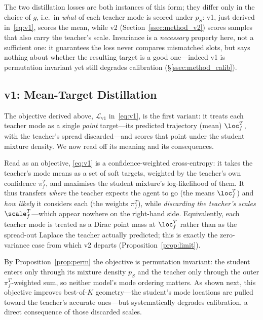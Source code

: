 The two distillation losses are both instances of this form; they differ only in the
choice of $g$, i.e.\ in \emph{what} of each teacher mode is scored under $p_S$: v1,
just derived in~\eqref{eq:v1}, scores the mean, while v2
(Section~\ref{ssec:method_v2}) scores samples that also carry the teacher's scale.
Invariance is a \emph{necessary} property here, not a sufficient one: it guarantees
the loss never compares mismatched slots, but says nothing about whether the
resulting target is a good one---indeed v1 is permutation invariant yet still
degrades calibration (\S\ref{ssec:method_calib}).

\subsection{v1: Mean-Target Distillation}
\label{ssec:method_v1}
The objective derived above, $\mathcal{L}_{\mathrm{v1}}$ in~\eqref{eq:v1}, is the
first variant: it treats each teacher mode as a single \emph{point} target---its
predicted trajectory (mean) $\loc^T_f$, with the teacher's spread discarded---and
scores that point under the student mixture density. We now read off its meaning and
its consequences.

Read as an objective, \eqref{eq:v1} is a confidence-weighted cross-entropy: it takes
the teacher's mode means as a set of soft targets, weighted by the teacher's own
confidence $\pi^T_f$, and maximises the student mixture's log-likelihood of them. It
thus transfers \emph{where} the teacher expects the agent to go (the means
$\loc^T_f$) and \emph{how likely} it considers each (the weights $\pi^T_f$), while
\emph{discarding the teacher's scales} $\scale^T_f$---which appear nowhere on the
right-hand side. Equivalently, each teacher mode is treated as a Dirac point mass at
$\loc^T_f$ rather than as the spread-out Laplace the teacher actually predicted; this
is exactly the zero-variance case from which v2 departs
(Proposition~\ref{prop:limit}).

By Proposition~\ref{prop:perm} the objective is permutation invariant: the student
enters only through its mixture density $p_S$ and the teacher only through the outer
$\pi^T_f$-weighted sum, so neither model's mode ordering matters. As shown next, this
objective improves best-of-$K$ geometry---the student's mode locations are pulled
toward the teacher's accurate ones---but systematically degrades calibration, a
direct consequence of those discarded scales.


